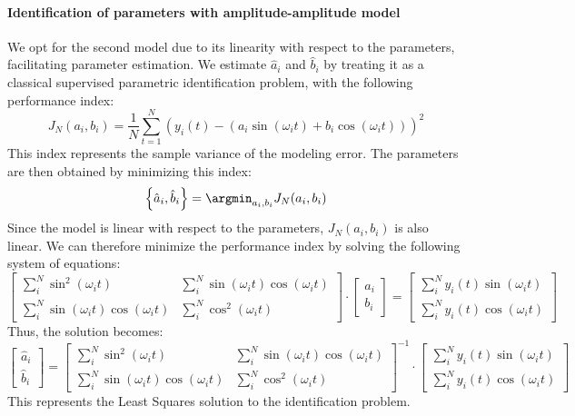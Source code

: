 \paragraph*{Identification of parameters with amplitude-amplitude model}
We opt for the second model due to its linearity with respect to the parameters, facilitating parameter estimation.
We estimate $\hat{a}_i$ and $\hat{b}_i$ by treating it as a classical supervised parametric identification problem, with the following performance index:
\[J_N(a_i,b_i)=\dfrac{1}{N}\sum_{t=1}^N\left(y_i(t)-\left(a_i\sin(\omega_it)+b_i\cos(\omega_it)\right)\right)^2\]
This index represents the sample variance of the modeling error. 
The parameters are then obtained by minimizing this index:
\[\left\{\hat{a}_i,\hat{b}_i\right\}=\argmin_{a_i,b_i}J_N(a_i,b_i)\]
Since the model is linear with respect to the parameters, $J_N(a_i,b_i)$ is also linear. 
We can therefore minimize the performance index by solving the following system of equations:
\[\begin{bmatrix} \sum_{i}^N \sin^2(\omega_it) & \sum_{i}^N \sin(\omega_it)\cos(\omega_it) \\ \sum_{i}^N \sin(\omega_it)\cos(\omega_it) & \sum_{i}^N \cos^2(\omega_it) \end{bmatrix}\cdot\begin{bmatrix} a_i \\ b_i \end{bmatrix}=\begin{bmatrix} \sum_{i}^N y_i(t)\sin(\omega_it) \\ \sum_{i}^N y_i(t)\cos(\omega_it) \end{bmatrix}\]
Thus, the solution becomes:
\[\begin{bmatrix} \hat{a}_i \\ \hat{b}_i \end{bmatrix}=\begin{bmatrix} \sum_{i}^N \sin^2(\omega_it) & \sum_{i}^N \sin(\omega_it)\cos(\omega_it) \\ \sum_{i}^N \sin(\omega_it)\cos(\omega_it) & \sum_{i}^N \cos^2(\omega_it) \end{bmatrix}^{-1}\cdot\begin{bmatrix} \sum_{i}^N y_i(t)\sin(\omega_it) \\ \sum_{i}^N y_i(t)\cos(\omega_it) \end{bmatrix}\]
This represents the Least Squares solution to the identification problem.

